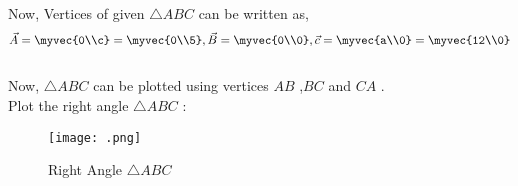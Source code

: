 \documentclass[journal,12pt,twocolumn]{IEEEtran}
\begin{document}
Now, Vertices of given $\triangle ABC$ can be written as,
\begin{align}
\vec{A}=\myvec{0\\c}=\myvec{0\\5}, \vec{B}=\myvec{0\\0}, \vec{c}=\myvec{a\\0}=\myvec{12\\0} 
\end{align}
\\
Now, $\triangle ABC$ can be plotted using vertices $AB$ ,$BC$ and $CA$ .
\\
Plot the right angle $\triangle ABC$ :
\begin{figure}[!ht]
\centering
\texttt{[image: .png]}
\caption{Right Angle $\triangle ABC$}
\label{fig:right_angle_triangle}	
\end{figure}
\end{document}
